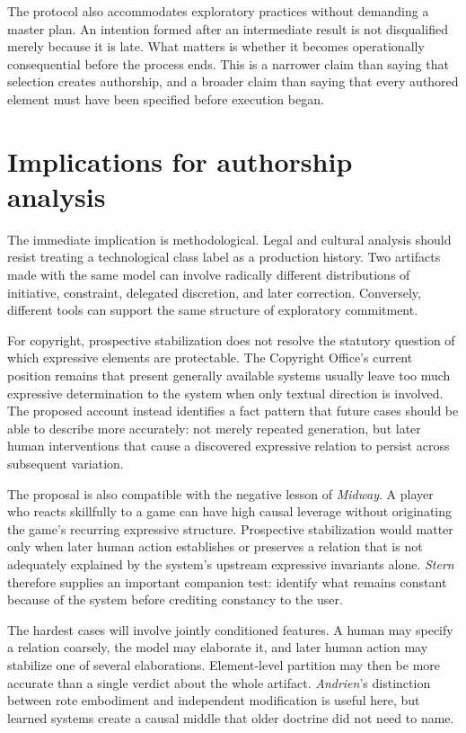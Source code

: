 \documentclass[11pt]{article}
\begin{document}
The protocol also accommodates exploratory practices without demanding a master plan. An intention formed after an intermediate result is not disqualified merely because it is late. What matters is whether it becomes operationally consequential before the process ends. This is a narrower claim than saying that selection creates authorship, and a broader claim than saying that every authored element must have been specified before execution began.

\section{Implications for authorship analysis}
The immediate implication is methodological. Legal and cultural analysis should resist treating a technological class label as a production history. Two artifacts made with the same model can involve radically different distributions of initiative, constraint, delegated discretion, and later correction. Conversely, different tools can support the same structure of exploratory commitment.

For copyright, prospective stabilization does not resolve the statutory question of which expressive elements are protectable. The Copyright Office's current position remains that present generally available systems usually leave too much expressive determination to the system when only textual direction is involved.\cite{usco2025copyrightability} The proposed account instead identifies a fact pattern that future cases should be able to describe more accurately: not merely repeated generation, but later human interventions that cause a discovered expressive relation to persist across subsequent variation.

The proposal is also compatible with the negative lesson of \textit{Midway}. A player who reacts skillfully to a game can have high causal leverage without originating the game's recurring expressive structure.\cite{midway1983} Prospective stabilization would matter only when later human action establishes or preserves a relation that is not adequately explained by the system's upstream expressive invariants alone. \textit{Stern} therefore supplies an important companion test: identify what remains constant because of the system before crediting constancy to the user.\cite{stern1982}

The hardest cases will involve jointly conditioned features. A human may specify a relation coarsely, the model may elaborate it, and later human action may stabilize one of several elaborations. Element-level partition may then be more accurate than a single verdict about the whole artifact. \textit{Andrien}'s distinction between rote embodiment and independent modification is useful here, but learned systems create a causal middle that older doctrine did not need to name.\cite{andrien1991}
\end{document}
